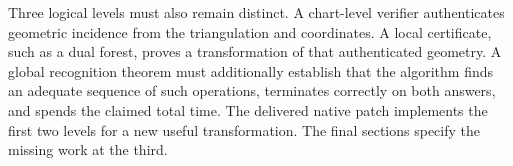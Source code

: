 Three logical levels must also remain distinct. A chart-level verifier
authenticates geometric incidence from the triangulation and coordinates.
A local certificate, such as a dual forest, proves a transformation of that
authenticated geometry. A global recognition theorem must additionally
establish that the algorithm finds an adequate sequence of such operations,
terminates correctly on both answers, and spends the claimed total time.
The delivered native patch implements the first two levels for a new useful
transformation. The final sections specify the missing work at the third.
